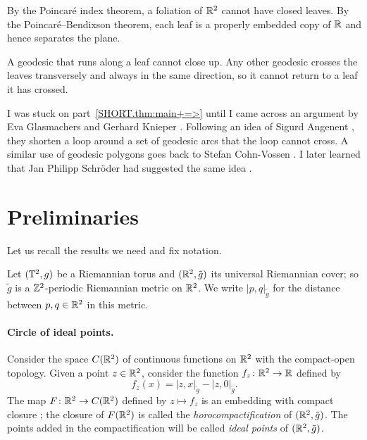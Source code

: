 \documentclass[a4paper,10pt]{article}
\begin{document}
By the Poincaré index theorem, a foliation of $\mathbb{R}^2$ cannot have closed leaves.
By the Poincaré--Bendixson theorem, each leaf is a properly embedded copy of $\mathbb{R}$ and hence separates the plane.

A geodesic that runs along a leaf cannot close up.
Any other geodesic crosses the leaves transversely and always in the same direction, so it cannot return to a leaf it has crossed.
\qeds

I was stuck on part~\ref{SHORT.thm:main+=>} until I came across an argument by Eva Glasmachers and Gerhard Knieper \cite[proofs of 3.2 and 3.4]{glasmachers-knieper}.
Following an idea of Sigurd Angenent \cite{angenent}, they shorten a loop around a set of geodesic arcs that the loop cannot cross.
A similar use of geodesic polygons goes back to Stefan Cohn-Vossen \cite{convossen,bangert1981}.
I later learned that Jan Philipp Schröder had suggested the same idea \cite[§~10.1, Fig.~9]{schroeder-survey}.


\section{Preliminaries}\label{sec:prelim}

Let us recall the results we need and fix notation.

Let $(\mathbb{T}^2,g)$ be a Riemannian torus and $(\mathbb{R}^2,\tilde g)$ its universal Riemannian cover;
so $\tilde g$ is a $\mathbb{Z}^2$-periodic Riemannian metric on $\mathbb{R}^2$.
We write $|p,q|_{\tilde g}$ for the distance between $p,q\in\mathbb{R}^2$ in this metric.

\paragraph{Circle of ideal points.}
Consider the space $C(\mathbb{R}^2)$ of continuous functions on $\mathbb{R}^2$ with the compact-open topology.
Given a point $z\in \mathbb{R}^2$, consider the function $f_z\colon \mathbb{R}^2\to \mathbb{R}$ defined by
\[f_z(x)=|z,x|_{\tilde g}-|z,0|_{\tilde g}.\]
The map $F\colon\mathbb{R}^2\to C(\mathbb{R}^2)$ defined by $z\mapsto f_z$ is an embedding with compact closure \cite[II § 1]{ballmann};
the closure of $F(\mathbb{R}^2)$ is called the \emph{horocompactification} of $(\mathbb{R}^2,\tilde g)$.
The points added in the compactification will be called \emph{ideal points} of $(\mathbb{R}^2,\tilde g)$.
\end{document}
